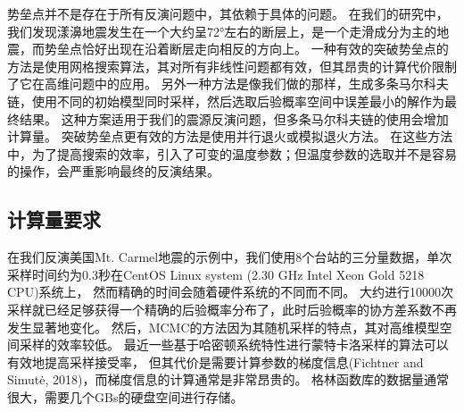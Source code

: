 势垒点并不是存在于所有反演问题中，其依赖于具体的问题。
在我们的研究中，我们发现漾濞地震发生在一个大约呈72°左右的断层上，是一个走滑成分为主的地震，而势垒点恰好出现在沿着断层走向相反的方向上。
一种有效的突破势垒点的方法是使用网格搜索算法，其对所有非线性问题都有效，但其昂贵的计算代价限制了它在高维问题中的应用。
另外一种方法是像我们做的那样，生成多条马尔科夫链，使用不同的初始模型同时采样，然后选取后验概率空间中误差最小的解作为最终结果。
这种方案适用于我们的震源反演问题，但多条马尔科夫链的使用会增加计算量。
突破势垒点更有效的方法是使用并行退火\citep{Dosso2013}或模拟退火方法\citep{Billings1994}。
在这些方法中，为了提高搜索的效率，引入了可变的温度参数；但温度参数的选取并不是容易的操作，会严重影响最终的反演结果\citep{Dosso2013}。

\subsection{计算量要求}

在我们反演美国Mt. Carmel地震的示例中，我们使用8个台站的三分量数据，单次采样时间约为0.3秒在CentOS Linux system (2.30 GHz Intel Xeon Gold 5218 CPU)系统上，
然而精确的时间会随着硬件系统的不同而不同。
大约进行10000次采样就已经足够获得一个精确的后验概率分布了，此时后验概率的协方差系数不再发生显著地变化。
然后，MCMC的方法因为其随机采样的特点，其对高维模型空间采样的效率较低\citep{Fang2019}。
最近一些基于哈密顿系统特性进行蒙特卡洛采样的算法可以有效地提高采样接受率，
但其代价是需要计算参数的梯度信息(Fichtner and Simutė, 2018)，而梯度信息的计算通常是非常昂贵的。
格林函数库的数据量通常很大，需要几个GBs的硬盘空间进行存储。






